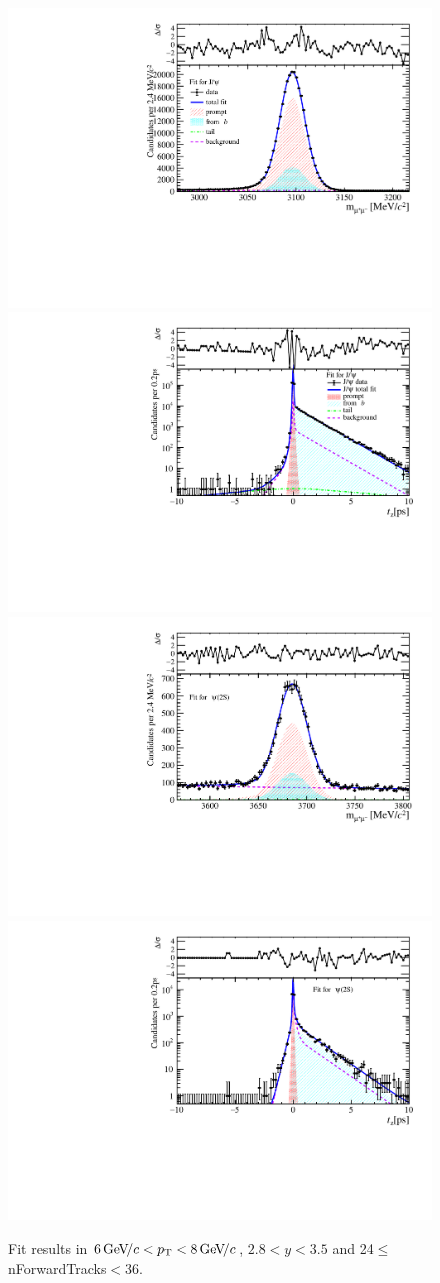 \begin{figure}[H]
\begin{center}
\includegraphics[width=0.47\linewidth]{pdf/Jpsi/drawmassF/n3y2pt4.pdf}
\includegraphics[width=0.47\linewidth]{pdf/Jpsi/2DFitF/n3y2pt4.pdf}
\vspace*{-0.5cm}
\includegraphics[width=0.47\linewidth]{pdf/Psi2S/drawmassF/n3y2pt4.pdf}
\includegraphics[width=0.47\linewidth]{pdf/Psi2S/2DFitF/n3y2pt4.pdf}
\vspace*{-0.5cm}
\end{center}
\caption{Fit results in $6\text{\,Ge\kern -0.1em V\!/}c<p_{\mathrm{T}}<8\text{\,Ge\kern -0.1em V\!/}c$, $2.8<y<3.5$ and 24$\leq$nForwardTracks$<$36.}
\label{Fitn3y2pt4}
\end{figure}
